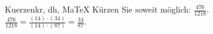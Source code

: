 \begin{MAufgabe}{Kuerzen}{kr, dh, MaTeX}
K\"urzen Sie soweit m\"oglich: $\frac{476}{1218}$.\\ 
\ifLsg\MLoesung
\quad $\frac{476}{1218}=\frac{(14)\cdot(34)}{(14)\cdot(87)}=\frac{34}{87}$.\else\relax\fi
 \end{MAufgabe}